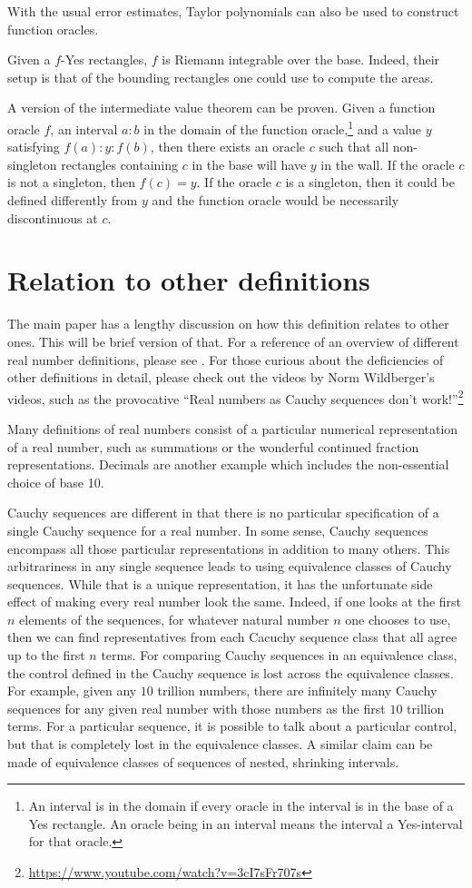 \documentclass[12pt]{article}
\theoremstyle{remark}
\begin{document}
With the usual error estimates, Taylor polynomials can also be used to construct function oracles. 

Given a $f$-Yes rectangles, $f$ is Riemann integrable over the base. Indeed, their setup is that of the bounding rectangles one could use to compute the areas. 

A version of the intermediate value theorem can be proven. Given a function oracle $f$, an interval $a:b$ in the domain of the function oracle,\footnote{An interval is in the domain if every oracle in the interval is in the base of a Yes rectangle. An oracle being in an interval means the interval a Yes-interval for that oracle.} and a value $y$ satisfying $f(a):y:f(b)$, then there exists an oracle $c$ such that all non-singleton rectangles containing $c$ in the base will have $y$ in the wall. If the oracle $c$ is not a singleton, then $f(c) = y$. If the oracle $c$ is a singleton, then it could be defined differently from $y$ and the function oracle would be necessarily discontinuous at $c$. 


\section{Relation to other definitions}

The main paper has a lengthy discussion on how this definition relates to other ones. This will be brief version of that. For a reference of an overview of different real number definitions, please see \cite{ittay-2015}. For those curious about the deficiencies of other definitions in detail, please check out the videos by Norm Wildberger's videos, such as the provocative ``Real numbers as Cauchy sequences don't work!''\footnote{\url{https://www.youtube.com/watch?v=3cI7sFr707s}} 

Many definitions of real numbers consist of a particular numerical representation of a real number, such as summations or the wonderful continued fraction representations. Decimals are another example which includes the non-essential choice of base 10. 

Cauchy sequences are different in that there is no particular specification of a single Cauchy sequence for a real number. In some sense, Cauchy sequences encompass all those particular representations in addition to many others. This arbitrariness in any single sequence leads to using equivalence classes of Cauchy sequences. While that is a unique representation, it has the unfortunate side effect of making every real number look the same. Indeed, if one looks at the first $n$ elements of the sequences, for whatever natural number $n$ one chooses to use, then we can find representatives from each Cacuchy sequence class that all agree up to the first $n$ terms. For comparing Cauchy sequences in an equivalence class, the control defined in the Cauchy sequence is lost across the equivalence classes. For example, given any $10$ trillion numbers, there are infinitely many Cauchy sequences for any given real number with those numbers as the first $10$ trillion terms. For a particular sequence, it is possible to talk about a particular control, but that is completely lost in the equivalence classes. A similar claim can be made of equivalence classes of sequences of nested, shrinking intervals. 
\end{document}
